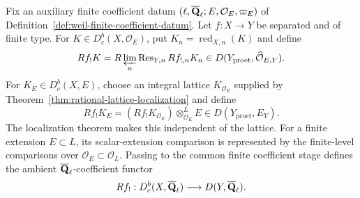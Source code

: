

\begin{definition}
\label{def:all-coefficient-compact-support}


Fix an auxiliary finite coefficient datum
\((\ell,\overline{\mathbf Q}_\ell;E,\mathcal O_E,\varpi_E)\) of
Definition~\ref{def:weil-finite-coefficient-datum}.  Let
\(f:X\to Y\) be separated and of finite type.  For
\(K\in D^b_c(X,\mathcal O_E)\), put
\(K_n=\operatorname{red}_{X,n}(K)\) and define
\[
 Rf_!K=
 R\varprojlim_n\operatorname{Res}_{Y,n} Rf_{!,n}K_n
 \in D(Y_{\mathrm{proet}},\widehat{\mathcal O}_{E,Y}).
\]
For \(K_E\in D^b_c(X,E)\), choose an integral lattice
\(K_{\mathcal O_E}\) supplied by
Theorem~\ref{thm:rational-lattice-localization} and define
\[
 Rf_!K_E=(Rf_!K_{\mathcal O_E})\otimes^L_{\mathcal O_E}E
 \in D(Y_{\mathrm{proet}},E_Y).
\]
The localization theorem makes this independent of the lattice.  For a
finite extension \(E\subset L\), its
scalar-extension comparison is represented by the finite-level
comparisons over \(\mathcal O_E\subset\mathcal O_L\).  Passing to the
common finite coefficient stage defines the ambient \(\overline{\mathbf Q}_\ell\)-coefficient
functor
\[
 Rf_!:D^b_c(X,\overline{\mathbf Q}_\ell)\longrightarrow D(Y,\overline{\mathbf Q}_\ell).
\]
\end{definition}


